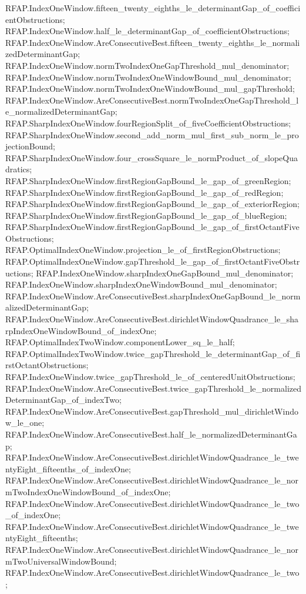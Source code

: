 \documentclass[11pt]{article}
\begin{document}
{RFAP.IndexOneWindow.fifteen_twenty_eighths_le_determinantGap_of_coefficientObstructions;
RFAP.IndexOneWindow.half_le_determinantGap_of_coefficientObstructions;
RFAP.IndexOneWindow.AreConsecutiveBest.fifteen_twenty_eighths_le_normalizedDeterminantGap;
RFAP.IndexOneWindow.normTwoIndexOneGapThreshold_mul_denominator;
RFAP.IndexOneWindow.normTwoIndexOneWindowBound_mul_denominator;
RFAP.IndexOneWindow.normTwoIndexOneWindowBound_mul_gapThreshold;
RFAP.IndexOneWindow.AreConsecutiveBest.normTwoIndexOneGapThreshold_le_normalizedDeterminantGap;
RFAP.SharpIndexOneWindow.fourRegionSplit_of_fiveCoefficientObstructions;
RFAP.SharpIndexOneWindow.second_add_norm_mul_first_sub_norm_le_projectionBound;
RFAP.SharpIndexOneWindow.four_crossSquare_le_normProduct_of_slopeQuadratics;
RFAP.SharpIndexOneWindow.firstRegionGapBound_le_gap_of_greenRegion;
RFAP.SharpIndexOneWindow.firstRegionGapBound_le_gap_of_redRegion;
RFAP.SharpIndexOneWindow.firstRegionGapBound_le_gap_of_exteriorRegion;
RFAP.SharpIndexOneWindow.firstRegionGapBound_le_gap_of_blueRegion;
RFAP.SharpIndexOneWindow.firstRegionGapBound_le_gap_of_firstOctantFiveObstructions;
RFAP.OptimalIndexOneWindow.projection_le_of_firstRegionObstructions;
RFAP.OptimalIndexOneWindow.gapThreshold_le_gap_of_firstOctantFiveObstructions;
RFAP.IndexOneWindow.sharpIndexOneGapBound_mul_denominator;
RFAP.IndexOneWindow.sharpIndexOneWindowBound_mul_denominator;
RFAP.IndexOneWindow.AreConsecutiveBest.sharpIndexOneGapBound_le_normalizedDeterminantGap;
RFAP.IndexOneWindow.AreConsecutiveBest.dirichletWindowQuadrance_le_sharpIndexOneWindowBound_of_indexOne;
RFAP.OptimalIndexTwoWindow.componentLower_sq_le_half;
RFAP.OptimalIndexTwoWindow.twice_gapThreshold_le_determinantGap_of_firstOctantObstructions;
RFAP.IndexOneWindow.twice_gapThreshold_le_of_centeredUnitObstructions;
RFAP.IndexOneWindow.AreConsecutiveBest.twice_gapThreshold_le_normalizedDeterminantGap_of_indexTwo;
RFAP.IndexOneWindow.AreConsecutiveBest.gapThreshold_mul_dirichletWindow_le_one;
RFAP.IndexOneWindow.AreConsecutiveBest.half_le_normalizedDeterminantGap;
RFAP.IndexOneWindow.AreConsecutiveBest.dirichletWindowQuadrance_le_twentyEight_fifteenths_of_indexOne;
RFAP.IndexOneWindow.AreConsecutiveBest.dirichletWindowQuadrance_le_normTwoIndexOneWindowBound_of_indexOne;
RFAP.IndexOneWindow.AreConsecutiveBest.dirichletWindowQuadrance_le_two_of_indexOne;
RFAP.IndexOneWindow.AreConsecutiveBest.dirichletWindowQuadrance_le_twentyEight_fifteenths;
RFAP.IndexOneWindow.AreConsecutiveBest.dirichletWindowQuadrance_le_normTwoUniversalWindowBound;
RFAP.IndexOneWindow.AreConsecutiveBest.dirichletWindowQuadrance_le_two;
}
\end{document}
